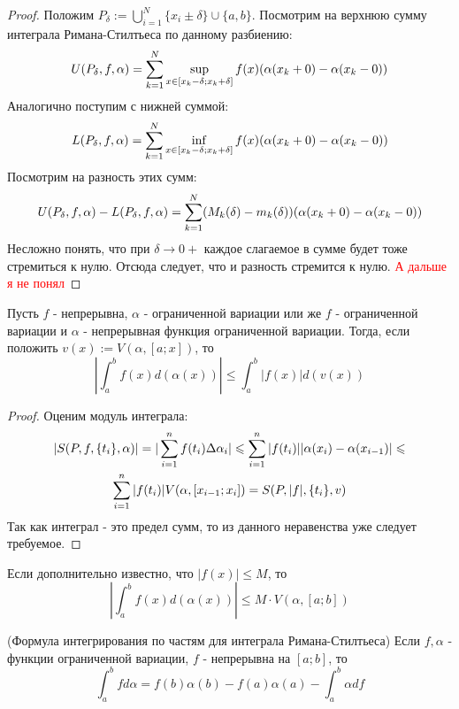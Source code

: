 \begin{proof}
	Положим $P_\delta := \bigcup\limits_{i = 1}^N \{x_i \pm \delta\} \cup \{a, b\}$. Посмотрим на верхнюю сумму интеграла Римана-Стилтьеса по данному разбиению:
	\[
		U(P_\delta, f, \alpha) = \sum\limits_{k = 1}^N \sup\limits_{x \in [x_k - \delta; x_k + \delta]} f(x) (\alpha(x_k + 0) - \alpha(x_k - 0))
	\]
	Аналогично поступим с нижней суммой:
	\[
		L(P_\delta, f, \alpha) = \sum\limits_{k = 1}^N \inf\limits_{x \in [x_k - \delta; x_k + \delta]} f(x) (\alpha(x_k + 0) - \alpha(x_k - 0))
	\]
	Посмотрим на разность этих сумм:
	\[
		U(P_\delta, f, \alpha) - L(P_\delta, f, \alpha) = \sum\limits_{k = 1}^N (M_k(\delta) - m_k(\delta)) (\alpha(x_k + 0) - \alpha(x_k - 0))
	\]
	Несложно понять, что при $\delta \to 0+$ каждое слагаемое в сумме будет тоже стремиться к нулю. Отсюда следует, что и разность стремится к нулю.
	\textcolor{red}{А дальше я не понял}
\end{proof}

\begin{theorem}
	Пусть $f$ - непрерывна, $\alpha$ - ограниченной вариации или же $f$ - ограниченной вариации и $\alpha$ - непрерывная функция ограниченной вариации. Тогда, если положить $v(x) := V(\alpha, [a; x])$, то
	\[
		\left|\int_a^b f(x) d(\alpha(x))\right| \le \int_a^b |f(x)| d(v(x))
	\]
\end{theorem}

\begin{proof}
	Оценим модуль интеграла:
	\begin{multline*}
		|S(P, f, \{t_i\}, \alpha)| = |\sum\limits_{i = 1}^n f(t_i) \Delta \alpha_i| \leqslant \sum\limits_{i = 1}^n |f(t_i)| |\alpha(x_i) - \alpha(x_{i - 1})| \leqslant
		\\
		\sum\limits_{i = 1}^n |f(t_i)| V(\alpha, [x_{i - 1}; x_i]) = S(P, |f|, \{t_i\}, v)
	\end{multline*}
	Так как интеграл - это предел сумм, то из данного неравенства уже следует требуемое.
\end{proof}

\begin{corollary}
	Если дополнительно известно, что $|f(x)| \le M$, то
	\[
		\left|\int_a^b f(x) d(\alpha(x))\right| \le M \cdot V(\alpha, [a; b])
	\]
\end{corollary}

\begin{theorem} (Формула интегрирования по частям для интеграла Римана-Стилтьеса)
	Если $f, \alpha$ - функции ограниченной вариации, $f$ - непрерывна на $[a; b]$, то
	\[
		\int_a^b f d\alpha = f(b)\alpha(b) - f(a)\alpha(a) - \int_a^b \alpha df
	\]
\end{theorem}

